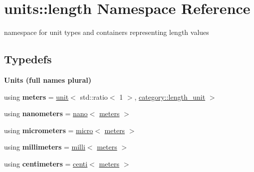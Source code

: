 \hypertarget{namespaceunits_1_1length}{}\section{units\+:\+:length Namespace Reference}
\label{namespaceunits_1_1length}


namespace for unit types and containers representing length values  


\subsection*{Typedefs}
\begin{Indent}{\bf Units (full names plural)}\par
\begin{DoxyCompactItemize}
\item 
\hypertarget{namespaceunits_1_1length_adfc9807df120f2b86395c507f8ff33ac}{}using {\bfseries meters} = \hyperlink{structunits_1_1unit}{unit}$<$ std\+::ratio$<$ 1 $>$, \hyperlink{namespaceunits_1_1category_a1140509fa711ad6ae98a4c001d99cfe5}{category\+::length\+\_\+unit} $>$\label{namespaceunits_1_1length_adfc9807df120f2b86395c507f8ff33ac}

\item 
\hypertarget{namespaceunits_1_1length_a55ad122312bef7737106cffb0cc7b479}{}using {\bfseries nanometers} = \hyperlink{group___unit_manipulators_ga1c25c3c1d6c1f3aed3fd1ecf043110d5}{nano}$<$ \hyperlink{structunits_1_1unit}{meters} $>$\label{namespaceunits_1_1length_a55ad122312bef7737106cffb0cc7b479}

\item 
\hypertarget{namespaceunits_1_1length_a4196e3c782fd30db3277027fec0d48d6}{}using {\bfseries micrometers} = \hyperlink{group___unit_manipulators_gaea53c906ec805110b93f02db4a961971}{micro}$<$ \hyperlink{structunits_1_1unit}{meters} $>$\label{namespaceunits_1_1length_a4196e3c782fd30db3277027fec0d48d6}

\item 
\hypertarget{namespaceunits_1_1length_ab4523cc2b37c350bf61fcda335cf7d05}{}using {\bfseries millimeters} = \hyperlink{group___unit_manipulators_gaec9d1c320e180eb59f3cb3094d8079dd}{milli}$<$ \hyperlink{structunits_1_1unit}{meters} $>$\label{namespaceunits_1_1length_ab4523cc2b37c350bf61fcda335cf7d05}

\item 
\hypertarget{namespaceunits_1_1length_a694fba791f981adfca427f7a5ed5ee00}{}using {\bfseries centimeters} = \hyperlink{group___unit_manipulators_ga33baefb1c4e794428d7ef77467a8b13e}{centi}$<$ \hyperlink{structunits_1_1unit}{meters} $>$\label{namespaceunits_1_1length_a694fba791f981adfca427f7a5ed5ee00}


\end{DoxyCompactItemize}
\end{Indent}
